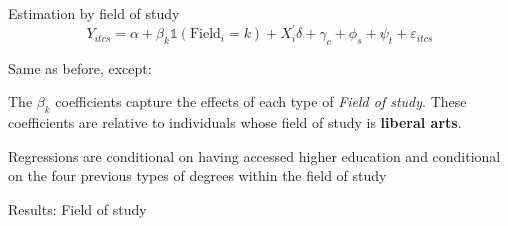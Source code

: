 \documentclass[11pt, aspectratio=169]{beamer}
\newenvironment{wideitemize}{\itemize\addtolength{\itemsep}{10pt}}{\enditemize}
\begin{document}
\begin{frame}{Estimation by field of study}
\begin{equation*}
    Y_{i t c s}=\alpha+\beta_k \mathbb{1}\left(\text {Field}_i=k\right)+X_i^{\prime} \delta+\gamma_c+\phi_s+\psi_t+\varepsilon_{i t c s}
\end{equation*}

Same as before, except:

\begin{wideitemize}
    \item The $\beta_k$ coefficients capture the effects of each type of \textit{Field of study}. These coefficients are relative to individuals whose field of study is \textbf{liberal arts}.
    \item Regressions are conditional on having accessed higher education and conditional on the four previous types of degrees within the field of study
\end{wideitemize}

\vfill
\end{frame}

\begin{frame}{Results: Field of study}
    \centering
\end{frame}
\end{document}
